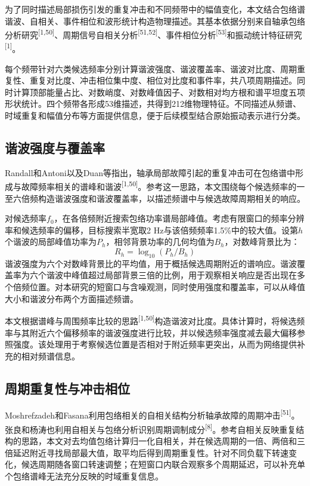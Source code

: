 \documentclass[UTF8,12pt,openany,twoside]{ctexbook}
\numberwithin{equation}{chapter}
\begin{document}
为了同时描述局部损伤引发的重复冲击和不同频带中的幅值变化，本文结合包络谱谐波、自相关、事件相位和波形统计构造物理描述。其基本依据分别来自轴承包络分析研究\textsuperscript{[1,50]}、周期信号自相关分析\textsuperscript{[51,52]}、事件相位分析\textsuperscript{[53]}和振动统计特征研究\textsuperscript{[1]}。

每个频带针对六类候选频率分别计算谐波强度、谐波覆盖率、谐波对比度、周期重复性、重复对比度、冲击相位集中度、相位对比度和事件率，共八项周期描述。同时计算顶部能量占比、对数峭度、对数峰值因子、对数相对均方根和谱平坦度五项形状统计。四个频带各形成53维描述，共得到212维物理特征。不同描述从频谱、时域重复和幅值分布等方面提供信息，便于后续模型结合原始振动表示进行分类。

\subsection{谐波强度与覆盖率}\label{ux8c10ux6ce2ux5f3aux5ea6ux4e0eux8986ux76d6ux7387}


Randall和Antoni以及Duan等指出，轴承局部故障引起的重复冲击可在包络谱中形成与故障频率相关的谱峰和谐波\textsuperscript{[1,50]}。参考这一思路，本文围绕每个候选频率的一至六倍频构造谐波强度和谐波覆盖率，以描述频谱中与候选故障周期相关的响应。

对候选频率$f_0$，在各倍频附近搜索包络功率谱局部峰值。考虑有限窗口的频率分辨率和候选频率的偏移，目标搜索半宽取2 Hz与该倍频频率1.5\%中的较大值。设第$h$个谐波的局部峰值功率为$P_h$，相邻背景功率的几何均值为$B_h$，对数峰背景比为：
\begin{equation}
\label{eq:auto05}
R_h=\log_{10}(P_h/B_h)
\end{equation}
谐波强度为六个对数峰背景比的平均值，用于概括候选周期附近的谱响应。谐波覆盖率为六个谐波中峰值超过局部背景三倍的比例，用于观察相关响应是否出现在多个倍频位置。对本研究的短窗口与含噪观测，同时使用强度和覆盖率，可以从峰值大小和谐波分布两个方面描述频谱。

本文根据谱峰与周围频率比较的思路\textsuperscript{[1,50]}构造谐波对比度。具体计算时，将候选频率与其附近六个偏移频率的谐波强度进行比较，并以候选频率强度减去最大偏移参照强度。该处理用于考察候选位置是否相对于附近频率更突出，从而为网络提供补充的相对频谱信息。

\subsection{周期重复性与冲击相位}\label{ux5468ux671fux91cdux590dux6027ux4e0eux51b2ux51fbux76f8ux4f4d}


Moshrefzadeh和Fasana利用包络相关的自相关结构分析轴承故障的周期冲击\textsuperscript{[51]}。 张良和杨涛也利用自相关与包络分析识别周期调制成分\textsuperscript{[8]}。参考自相关反映重复结构的思路，本文对去均值包络计算归一化自相关，并在候选周期的一倍、两倍和三倍延迟附近寻找局部最大值，取平均后得到周期重复性。针对不同负载下转速变化，候选周期随各窗口转速调整；在短窗口内联合观察多个周期延迟，可以补充单个包络谱峰无法充分反映的时域重复信息。
\end{document}

